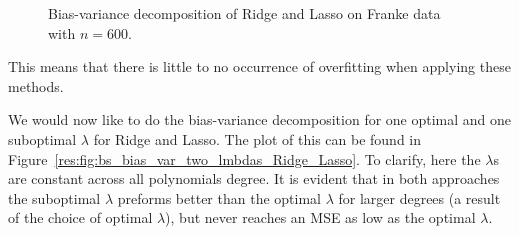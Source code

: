 \documentclass[twocolumn,english,notitlepage]{article}
\begin{document}
\begin{figure}[ht]
\begin{subfigure}{\linewidth}
                \end{subfigure}
                \caption{Bias-variance decomposition of Ridge and Lasso on Franke data with $n=600$.}
                \label{res:fig:bs_bias_var_Ridge_Lasso}
            \end{figure}
            This means that there is little to no occurrence of overfitting when applying these methods.     

            We would now like to do the bias-variance decomposition for one optimal and one suboptimal $\lambda$ for Ridge and Lasso. The plot of this can be found in Figure~\ref{res:fig:bs_bias_var_two_lmbdas_Ridge_Lasso}. To clarify, here the $\lambda$s are constant across all polynomials degree. It is evident that in both approaches the suboptimal $\lambda$ preforms better than the optimal $\lambda$ for larger degrees (a result of the choice of optimal $\lambda$), but never reaches an MSE as low as the optimal $\lambda$. 
\end{document}
